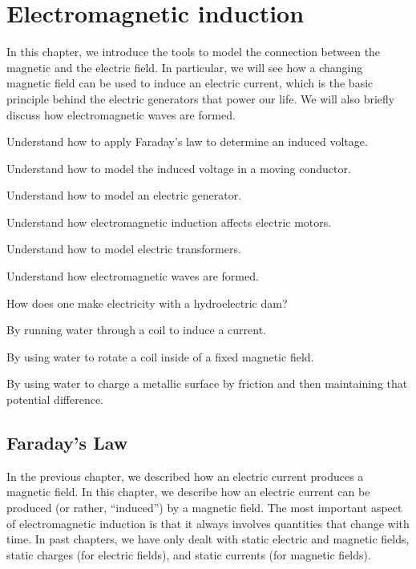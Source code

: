 \chapter{Electromagnetic induction}
\label{chapter:induction}
In this chapter, we introduce the tools to model the connection between the magnetic and the electric field. In particular, we will see how a changing magnetic field can be used to induce an electric current, which is the basic principle behind the electric generators that power our life. We will also briefly discuss how electromagnetic waves are formed.

\begin{learningObjectives}{
 \item Understand how to apply Faraday's law to determine an induced voltage.
 \item Understand how to model the induced voltage in a moving conductor.
 \item Understand how to model an electric generator.
 \item Understand how electromagnetic induction affects electric motors.
 \item Understand how to model electric transformers.
 \item Understand how electromagnetic waves are formed.
 }
\end{learningObjectives}

\begin{opening}
\begin{MCquestion}{How does one make electricity with a hydroelectric dam?}
\item By running water through a coil to induce a current.
\item By using water to rotate a coil inside of a fixed magnetic field. \correct
\item By using water to charge a metallic surface by friction and then maintaining that potential difference.
\end{MCquestion}
\end{opening}

\section{Faraday's Law}
In the previous chapter, we described how an electric current produces a magnetic field. In this chapter, we describe how an electric current can be produced (or rather, ``induced'') by a magnetic field. The most important aspect of electromagnetic induction is that it always involves quantities that change with time. In past chapters, we have only dealt with static electric and magnetic fields, static charges (for electric fields), and static currents (for magnetic fields). 

